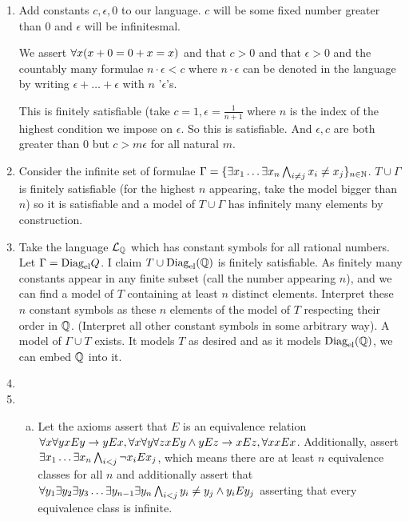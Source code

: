 
\begin{enumerate}[1.]
\item Add constants \(c, \epsilon, 0\) to our language. \(c\) will be some fixed number greater than 0 and \(\epsilon\) will be infinitesmal.

We assert \(\forall x (x + 0 = 0 + x = x)\) and that \(c > 0\) and that \(\epsilon > 0\) and the countably many formulae \(n \cdot \epsilon < c\) where \(n \cdot \epsilon\) can be denoted in the language by writing \(\epsilon + \ldots + \epsilon\) with \(n\) '\(\epsilon\)'s. 

This is finitely satisfiable (take \(c = 1, \epsilon = \frac{1}{n+1}\) where \(n\) is the index of the highest condition we impose on \(\epsilon\). So this is satisfiable. And \(\epsilon, c\) are both greater than 0 but \(c > m\epsilon\) for all natural \(m\).   

 
\item Consider the infinite set of formulae \(\Gamma = \{\exists x_1 \ldots \exists x_n \bigwedge_{i \neq j}x_i \neq x_j\}_{n \in \mathbb{N}}\). \(T \cup \Gamma\) is finitely satisfiable (for the highest \(n\) appearing, take the model bigger than \(n\)) so it is satisfiable and a model of \(T \cup \Gamma\) has infinitely many elements by construction. 
 
\item Take the language \(\mathcal{L}_{\mathbb{Q}}\) which has constant symbols for all rational numbers. Let \(\Gamma = \text{Diag}_\text{el}{Q}\). I claim \(T \cup \text{Diag}_\text{el}(\mathbb{Q})\) is finitely satisfiable. As finitely many constants appear in any finite subset (call the number appearing \(n\)), and we can find a model of \(T\) containing at least \(n\) distinct elements. Interpret these \(n\) constant symbols as these \(n\) elements of the model of \(T\) respecting their order in \(\mathbb{Q}\). (Interpret all other constant symbols in some arbitrary way). A model of \(\Gamma \cup T\) exists. It models \(T\) as desired and as it models \(\text{Diag}_\text{el}(\mathbb{Q})\), we can embed \(\mathbb{Q}\) into it.  
 
\item 
 
\item 
\begin{enumerate}[a)]
  \item Let the axioms assert that \(E\) is an equivalence relation \(\forall x \forall y xEy \to yEx, \forall x \forall y \forall z xEy \land yEz \to xEz, \forall x xEx\). Additionally, assert \(\exists x_1 \ldots \exists x_n \bigwedge_{i < j} \neg x_i E x_j\), which means there are at least \(n\) equivalence classes for all \(n\) and additionally assert that \(\forall y_1 \exists y_2 \exists y_3 \ldots \exists y_{n-1} \exists y_n \bigwedge_{i < j} y_i \neq y_j \land y_i E y_j\) asserting that every equivalence class is infinite. 


\end{enumerate}
\end{enumerate}
